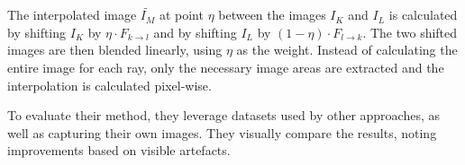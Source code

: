 
The interpolated image $\widetilde{I_M}$ at point $\eta$ between the images $I_K$ and $I_L$ is calculated by shifting $I_K$ by $\eta \cdot F_{k\rightarrow l}$ and by shifting $I_L$ by $(1 - \eta) \cdot F_{l\rightarrow k}$. The two shifted images are then blended linearly, using $\eta$ as the weight. Instead of calculating the entire image for each ray, only the necessary image areas are extracted and the interpolation is calculated pixel-wise.

To evaluate their method, they leverage datasets used by other approaches, as well as capturing their own images. They visually compare the results, noting improvements based on visible artefacts.


%

